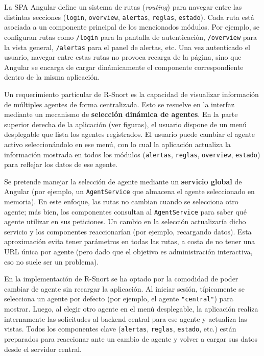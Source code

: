 \documentclass[11pt,a4paper,twoside]{report}
\begin{document}
La SPA Angular define un sistema de rutas (\textit{routing}) para navegar entre las distintas secciones (\texttt{login}, \texttt{overview}, \texttt{alertas}, \texttt{reglas}, \texttt{estado}). Cada ruta está asociada a un componente principal de los mencionados módulos. Por ejemplo, se configuran rutas como \texttt{/login} para la pantalla de autenticación, \texttt{/overview} para la vista general, \texttt{/alertas} para el panel de alertas, etc. Una vez autenticado el usuario, navegar entre estas rutas no provoca recarga de la página, sino que Angular se encarga de cargar dinámicamente el componente correspondiente dentro de la misma aplicación.\newline

Un requerimiento particular de R-Snort es la capacidad de visualizar información de múltiples agentes de forma centralizada. Esto se resuelve en la interfaz mediante un mecanismo de \textbf{selección dinámica de agentes}. En la parte superior derecha de la aplicación (ver figuras), el usuario dispone de un menú desplegable que lista los agentes registrados. El usuario puede cambiar el agente activo seleccionándolo en ese menú, con lo cual la aplicación actualiza la información mostrada en todos los módulos (\texttt{alertas}, \texttt{reglas}, \texttt{overview}, \texttt{estado}) para reflejar los datos de ese agente.\newline

Se pretende manejar la selección de agente mediante un \textbf{servicio global} de Angular (por ejemplo, un \texttt{AgentService} que almacena el agente seleccionado en memoria). En este enfoque, las rutas no cambian cuando se selecciona otro agente; más bien, los componentes consultan al \texttt{AgentService} para saber qué agente utilizar en sus peticiones. Un cambio en la selección actualizaría dicho servicio y los componentes reaccionarían (por ejemplo, recargando datos). Esta aproximación evita tener parámetros en todas las rutas, a costa de no tener una URL única por agente (pero dado que el objetivo es administración interactiva, eso no suele ser un problema).\newline

En la implementación de R-Snort se ha optado por la comodidad de poder cambiar de agente sin recargar la aplicación. Al iniciar sesión, típicamente se selecciona un agente por defecto (por ejemplo, el agente \texttt{"central"}) para mostrar. Luego, al elegir otro agente en el menú desplegable, la aplicación realiza internamente las solicitudes al backend central para ese agente y actualiza las vistas. Todos los componentes clave (\texttt{alertas}, \texttt{reglas}, \texttt{estado}, etc.) están preparados para reaccionar ante un cambio de agente y volver a cargar sus datos desde el servidor central.\newline
\end{document}
